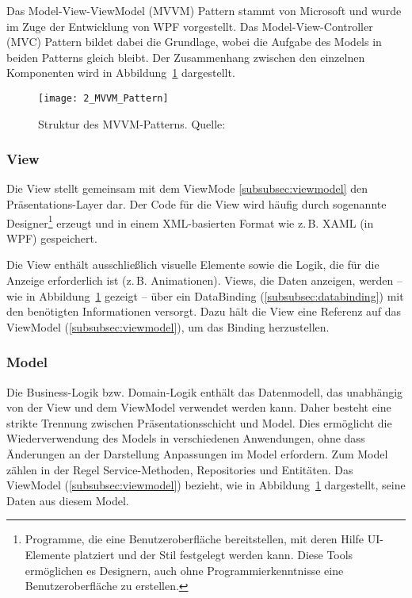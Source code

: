 Das Model-View-ViewModel (MVVM) Pattern stammt von Microsoft \cite{Gossman2005MVVM} und wurde im Zuge der Entwicklung von WPF vorgestellt. 
Das Model-View-Controller (MVC) Pattern \cite{Krasner1988MVC} bildet dabei die Grundlage, wobei die Aufgabe des Models in beiden Patterns gleich bleibt. 
Der Zusammenhang zwischen den einzelnen Komponenten wird in Abbildung~\ref{fig:mvvm_pattern} dargestellt.

\begin{figure}[H]
    \centering
    \texttt{[image: 2\_MVVM\_Pattern]}
    \caption{Struktur des MVVM-Patterns. Quelle: \cite{Uncopy2024MVVMPattern}}
    \label{fig:mvvm_pattern}
\end{figure}

\subsubsection{View}
\label{subsubsec:view_for_mvvm}
Die View stellt gemeinsam mit dem ViewMode \ref{subsubsec:viewmodel} den Präsentations-Layer dar. 
Der Code für die View wird häufig durch sogenannte Designer\footnote{Programme, die eine Benutzeroberfläche bereitstellen, mit deren Hilfe UI-Elemente platziert und der Stil festgelegt werden kann. 
Diese Tools ermöglichen es Designern, auch ohne Programmierkenntnisse eine Benutzeroberfläche zu erstellen.} erzeugt und in einem XML-basierten Format wie z.\,B. XAML (in WPF) gespeichert. 

Die View enthält ausschließlich visuelle Elemente sowie die Logik, die für die Anzeige erforderlich ist (z.\,B. Animationen). 
Views, die Daten anzeigen, werden – wie in Abbildung~\ref{fig:mvvm_pattern} gezeigt – über ein DataBinding (\ref{subsubsec:databinding}) mit den benötigten Informationen versorgt. 
Dazu hält die View eine Referenz auf das ViewModel (\ref{subsubsec:viewmodel}), um das Binding herzustellen.

\subsubsection{Model}
\label{subsubsec:model_for_mvvm}
Die Business-Logik bzw. Domain-Logik enthält das Datenmodell, das unabhängig von der View und dem ViewModel verwendet werden kann. 
Daher besteht eine strikte Trennung zwischen Präsentationsschicht und Model. 
Dies ermöglicht die Wiederverwendung des Models in verschiedenen Anwendungen, ohne dass Änderungen an der Darstellung Anpassungen im Model erfordern. 
Zum Model zählen in der Regel Service-Methoden, Repositories und Entitäten. 
Das ViewModel (\ref{subsubsec:viewmodel}) bezieht, wie in Abbildung~\ref{fig:mvvm_pattern} dargestellt, seine Daten aus diesem Model.


